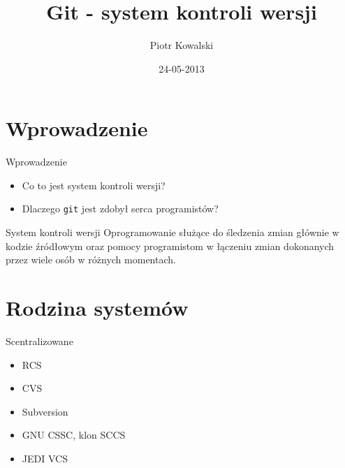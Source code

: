 \documentclass{beamer}
\title[Git]{Git - system kontroli wersji}
\author{Piotr Kowalski}
\institute{Wyższa Szkoła Informatyki Stosowanej i Zarządzania}
\date{24-05-2013}
\begin{document}


\lstset{escapechar=@,style=customc}
	

\begin{frame}
  \titlepage
\end{frame}


\section{Wprowadzenie}

\begin{frame}{Wprowadzenie}
\begin{itemize}
  \item Co to jest system kontroli wersji?
  \item Dlaczego \texttt{git} jest zdobył serca programistów?
\end{itemize}
\vskip 1cm
\begin{block}{System kontroli wersji}
Oprogramowanie służące do śledzenia zmian głównie w kodzie źródłowym oraz pomocy programistom w łączeniu zmian dokonanych przez wiele osób w różnych momentach.
\end{block}
\end{frame}


\section{Rodzina systemów}

\begin{frame}{Scentralizowane}
\begin{itemize}
  \item RCS
  \item CVS
  \item Subversion
  \item GNU CSSC, klon SCCS
  \item JEDI VCS
\end{itemize}
\end{frame}
\end{document}
